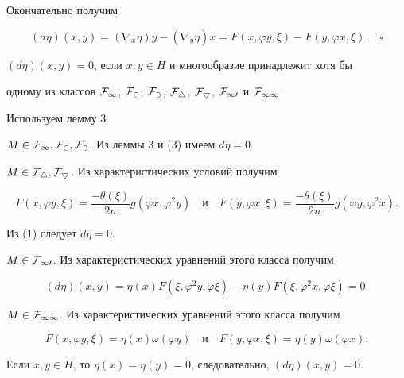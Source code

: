Окончательно получим 


$$ 


(d\eta)(x,y)=(\nabla_x\eta)y-(\nabla_y\eta)x= 


F(x,\varphi y,\xi)-F(y,\varphi x,\xi).\quad\square 


$$ 


 


\begin{thm} 


$(d\eta)(x,y)=0$, если $x,y\in H$ и многообразие принадлежит хотя бы 


одному из классов $\cal F_1$, $\cal F_2$, $\cal F_3$, $\cal F_4$, $\cal 


F_5$, $\cal F_{10}$ и $\cal F_{11}$. 


\end{thm} 


 


\begin{pf} 


Используем лемму 3. 


 


$M\in\cal F_1,\cal F_2,\cal F_3$. Из леммы 3 и (3) имеем $d\eta=0$. 


 


$M\in\cal F_4,\cal F_5$. Из характеристических условий получим 


$$ 


F(x,\varphi y,\xi)=\frac{-\theta(\xi)}{2n} 


g(\varphi x,\varphi ^2y)\quad 


\text{и} 


\quad F(y,\varphi x,\xi)=\frac{-\theta(\xi)}{2n} 


g(\varphi y,\varphi ^2x). 


$$ 


Из (1) следует $d\eta=0$. 


 


$M\in\cal F_{10}$. Из характеристических уравнений этого класса получим 


$$ 


(d\eta)(x,y)=\eta(x)F(\xi,\varphi ^2y,\varphi \xi)- 


\eta(y)F(\xi,\varphi ^2x,\varphi \xi)=0. 


$$ 


 


$M\in\cal F_{11}$. Из характеристических уравнений этого класса получим 


$$ 


F(x,\varphi y,\xi)=\eta(x)\omega(\varphi y)\quad 


\text{и}\quad 


F(y,\varphi x,\xi)=\eta(y)\omega(\varphi x). 


$$ 


Если $x,y\in H$, то $\eta(x)=\eta(y)=0$, следовательно, $(d\eta)(x,y)=0$. 


\end{pf} 


